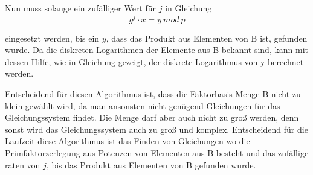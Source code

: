 		Nun muss solange ein zufälliger Wert für $j$ in Gleichung
		\begin{equation}
			g^j \cdot x = y~mod~p
			\label{Gleichung Diskreten Logarithmus Gleichung 2}
		\end{equation}
		
		eingesetzt werden, bis ein $y$, dass das Produkt aus Elementen von B ist, gefunden wurde. Da die diskreten Logarithmen der Elemente aus B bekannt sind, kann mit dessen Hilfe, wie in Gleichung  gezeigt, der diskrete Logarithmus von y berechnet werden.
		
		Entscheidend für diesen Algorithmus ist, dass die Faktorbasis Menge B nicht zu klein gewählt wird, da man ansonsten nicht genügend Gleichungen für das Gleichungssystem findet. Die Menge darf aber auch nicht zu groß werden, denn sonst wird das Gleichungssystem auch zu groß und komplex. Entscheidend für die Laufzeit diese Algorithmus ist das Finden von Gleichungen wo die Primfaktorzerlegung aus Potenzen von Elementen aus B besteht und das zufällige raten von $j$, bis das Produkt aus Elementen von B gefunden wurde.
